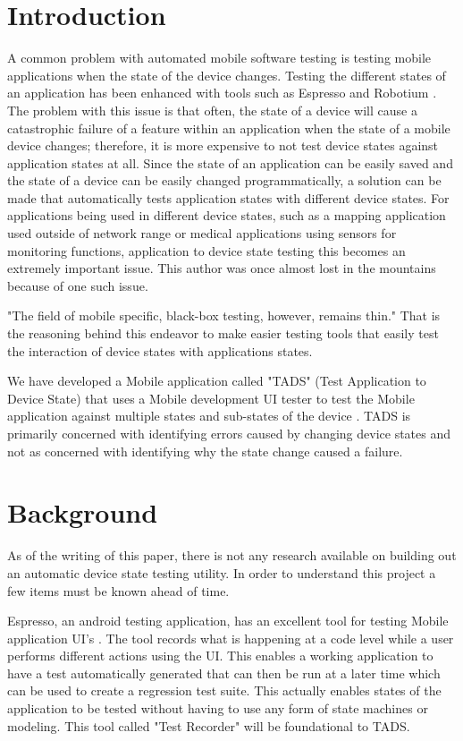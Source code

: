 \section{Introduction}
A common problem with automated mobile software testing is testing mobile applications when the state of the device changes.  Testing the different states of an application has been enhanced with tools such as Espresso and Robotium \cite{optimusinformationinc2016}. The problem with this issue is that often, the state of a device will cause a catastrophic failure of a feature within an application when the state of a mobile device changes; therefore, it is more expensive to not test device states against application states at all.  Since the state of an application can be easily saved and the state of a device can be easily changed programmatically, a solution can be made that automatically tests application states with different device states.  For applications being used in different device states, such as a mapping application used outside of network range or medical applications using sensors for monitoring functions, application to device state testing this becomes an extremely important issue.  This author was once almost lost in the mountains because of one such issue.    

"The field of mobile specific, black-box testing, however, remains thin." \cite{paulovsky2017high}  That is the reasoning behind this endeavor to make easier testing tools that easily test the interaction of device states with applications states.  

We have developed a Mobile application called "TADS" (Test Application to Device State) that uses a Mobile development UI tester to test the Mobile application against multiple states and sub-states of the device \cite{366932}.  TADS is primarily concerned with identifying errors caused by changing device states and not as concerned with identifying why the state change caused a failure.

\section{Background}
As of the writing of this paper, there is not any research available on building out an automatic device state testing utility.  In order to understand this project a few items must be known ahead of time.  

Espresso, an android testing application, has an excellent tool for testing Mobile application UI's \cite{nolan2015agile}.  The tool records what is happening at a code level while a user performs different actions using the UI.  This enables a working application to have a test automatically generated that can then be run at a later time which can be used to create a regression test suite.  This actually enables states of the application to be tested without having to use any form of state machines or modeling.  This tool called "Test Recorder" will be foundational to TADS. 


